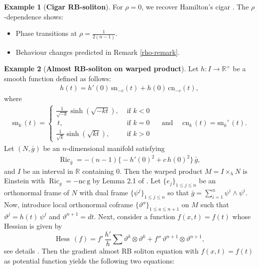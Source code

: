 \documentclass[a4paper, twoside, 10pt]{article}
\numberwithin{equation}{section}
\theoremstyle{definition}
\newtheorem{example}{Example}[section]
\begin{document}
\begin{example}[\bf Cigar RB-soliton]
For $\rho=0$, we recover Hamilton's cigar \cite{PT}. The $\rho$-dependence shows:
\begin{itemize}
    \item Phase transitions at $\rho = \frac{1}{2(n-1)}$.
    \item Behaviour changes predicted in Remark \ref{rho-remark}.
\end{itemize}
\end{example}

\begin{example}[{\bf Almost RB-soliton on warped product}]

Let $h : I \rightarrow \mathbb{R}^{+}$ be a smooth function defined as follows: 
\begin{align}
    h(t)=h'(0)\,\mbox{sn}_{-c}(t)+h(0)\,\mbox{cn}_{-c}(t),  
\end{align}
where 
\begin{align}
    \mbox{sn}_k\,(t)= \begin{cases}
        \frac{1}{\sqrt {-k}} \sinh({\sqrt{-kt}}), &\text{ if } k<0 \\
        \ t, &\text{ if } k=0 \\
         \frac{1}{\sqrt k} \sinh({\sqrt {kt}}), &\text{ if } k>0
     \end{cases}
     \quad \text{ and }\quad \mbox{cn}_k \, (t)=\mbox{sn}_k' \,(t).
\end{align}
Let $(N,\bar g)$ be an $n$-dimensional manifold satisfying 
\begin{align*}
    \operatorname{Ric}_{\bar g} =-(n-1)\bigg \{-h'(0)^2 +c\,h(0)^2 \bigg\}\, \bar g,
\end{align*}
and $I$ be an interval in $\mathbb{R}$ containing $0$. Then the warped product $M = I \times_{h} N $ is Einstein with $\operatorname{Ric}_g=-\mbox{nc}\,\mbox{g}$ by Lemma 2.1 of \cite{pigola2011ricci}. Let $\{e_j\}_{1 \leq j \leq n}$  be an orthonormal frame of $N$ with dual frame $\{\psi^{j}\}_{1 \leq j \leq n}$ so that $\bar g =\sum_{i=1}^n \psi^i \wedge \psi^i$. Now, introduce local orthonormal coframe $\{\vartheta^{a}\}_{1 \leq a \leq n+1}$ on $M$ such that $\vartheta^j=h(t)\, \psi^j$ and $\vartheta^{n+1}=dt$. Next, consider a function $f(x,t)=f(t)$ whose Hessian is given by
\[
\operatorname{Hess}\,(f) =f'\,\frac{h'}{h} \sum \vartheta^k \otimes \vartheta^k +f'' \,\vartheta^{n+1} \otimes \vartheta^{n+1},
\] 
see details \cite[p.764-766]{pigola2011ricci}. Then the 
gradient almost RB  soliton equation with $f(x,t) =f(t)$ as potential function yields the following two equations:

\end{example}
\end{document}
